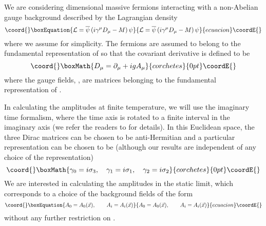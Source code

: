 \documentclass[a4paper,12pt]{article}
\begin{document}
We are considering \coordHE{} dimensional massive fermions interacting with a
non-Abelian gauge background described by the Lagrangian density
\begin{equation}\coord{}\boxEquation{
{\cal L} = \overline{\psi}\left(i\gamma^{\mu}D_{\mu} - M\right)\psi
}{
{\cal L} = \overline{\psi}\left(i\gamma^{\mu}D_{\mu} - M\right)\psi
}{ecuacion}\coordE{}\end{equation}
where we assume \coordHE{} for simplicity. The fermions are assumed to belong to the
fundamental representation of \coordHE{} so that the covariant derivative is
defined to be
\[\coord{}\boxMath{
D_{\mu} = \partial_{\mu} + ig A_{\mu}
}{corchetes}{0pt}\coordE{}\]
where the gauge fields, \coordHE{}, are matrices belonging to the
fundamental representation of \coordHE{}.

In calculating the amplitudes at finite temperature, we will use the
imaginary time formalism, where the time axis is rotated to a finite
interval in the imaginary axis (we refer the readers 
to \cite{das:book97,kapusta:book89,lebellac:book96} for details). In
this  Euclidean space,  the three Dirac matrices can be
chosen to be anti-Hermitian and a particular representation can be
chosen to be (although our results are independent of any choice of
the representation)
\[\coord{}\boxMath{
\gamma_{0} = i\sigma_{3},\quad \gamma_{1} = i\sigma_{1},\quad
\gamma_{2} = i\sigma_{2}
}{corchetes}{0pt}\coordE{}\]
We are interested in calculating the amplitudes in the static limit,
which corresponds to a choice of the background fields of the form
\begin{equation}\coord{}\boxEquation{
A_{0} = A_{0}(\vec{x}),\qquad A_{i} = A_{i}(\vec{x})\label{2}
}{
A_{0} = A_{0}(\vec{x}),\qquad A_{i} = A_{i}(\vec{x})}{ecuacion}\coordE{}\end{equation}
without any further restriction on \coordHE{}.
\end{document}
